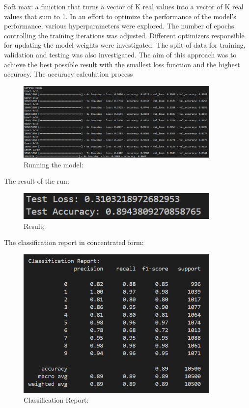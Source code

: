 \documentclass{article}
\begin{document}
Soft max: a function that turns a vector of K real values into a vector of K real values that sum to 1.
In an effort to optimize the performance of the model's performance, various hyperparameters were explored.
The number of epochs controlling the training iterations was adjusted. Different optimizers responsible for updating the model weights were investigated. The split of data for training, validation and testing was also investigated. The aim of this approach was to achieve the best possible result with the smallest loss function and the highest accuracy.
The accuracy calculation process
\begin{figure}[H]
    \caption{Running the model:}
    \centering
    \includegraphics[width=10cm]{imgFolder/RunningSoftMax.png}
\end{figure}
The result of the run:
\begin{figure}[H]
    \caption{Result:}
    \centering
    \includegraphics[width=10cm]{imgFolder/softMaxResult.png}
\end{figure}

The classification report in concentrated form:
\begin{figure}[H]
    \caption{Classification Report:}
    \centering
    \includegraphics[width=10cm]{imgFolder/classificationReportSoftmax.png}
\end{figure}
\end{document}
